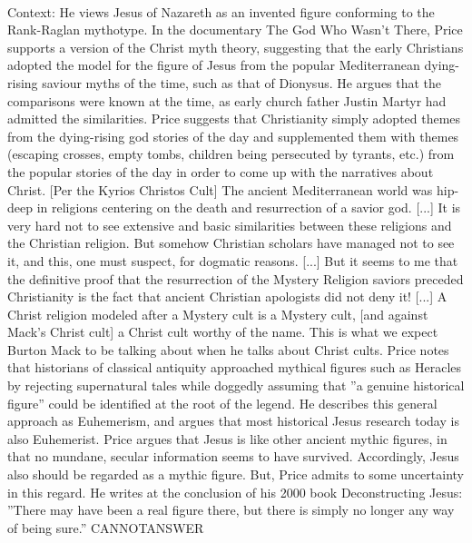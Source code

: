 \documentclass[11pt,a4paper, onecolumn]{article}
\begin{document}
\\ Context: He views Jesus of Nazareth as an invented figure conforming to the Rank-Raglan mythotype.  In the documentary The God Who Wasn't There, Price supports a version of the Christ myth theory, suggesting that the early Christians adopted the model for the figure of Jesus from the popular Mediterranean dying-rising saviour myths of the time, such as that of Dionysus. He argues that the comparisons were known at the time, as early church father Justin Martyr had admitted the similarities. Price suggests that Christianity simply adopted themes from the dying-rising god stories of the day and supplemented them with themes (escaping crosses, empty tombs, children being persecuted by tyrants, etc.) from the popular stories of the day in order to come up with the narratives about Christ. [Per the Kyrios Christos Cult] The ancient Mediterranean world was hip-deep in religions centering on the death and resurrection of a savior god. [...] It is very hard not to see extensive and basic similarities between these religions and the Christian religion. But somehow Christian scholars have managed not to see it, and this, one must suspect, for dogmatic reasons. [...] But it seems to me that the definitive proof that the resurrection of the Mystery Religion saviors preceded Christianity is the fact that ancient Christian apologists did not deny it! [...] A Christ religion modeled after a Mystery cult is a Mystery cult, [and against Mack's Christ cult] a Christ cult worthy of the name. This is what we expect Burton Mack to be talking about when he talks about Christ cults. Price notes that historians of classical antiquity approached mythical figures such as Heracles by rejecting supernatural tales while doggedly assuming that ''a genuine historical figure'' could be identified at the root of the legend. He describes this general approach as Euhemerism, and argues that most historical Jesus research today is also Euhemerist. Price argues that Jesus is like other ancient mythic figures, in that no mundane, secular information seems to have survived. Accordingly, Jesus also should be regarded as a mythic figure. But, Price admits to some uncertainty in this regard. He writes at the conclusion of his 2000 book Deconstructing Jesus: ''There may have been a real figure there, but there is simply no longer any way of being sure.'' CANNOTANSWER
\end{document}
